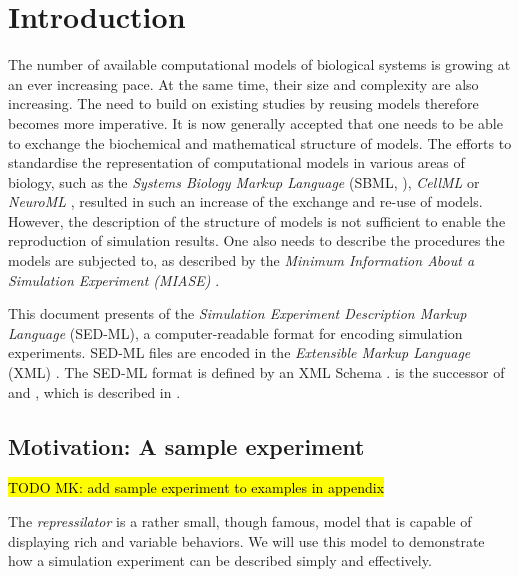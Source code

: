\chapter{Introduction}

The number of available computational models of biological systems is growing at an ever increasing pace. 
At the same time, their size and complexity are also increasing. The need to build on existing studies by reusing models therefore becomes more imperative. It is now generally accepted that one needs to be able to exchange the biochemical and mathematical structure of models. The efforts to standardise the representation of computational models in various areas of biology, such as the \emph{Systems Biology Markup Language} (SBML, \citep{Hucka:2003}), \emph{CellML} \citep{cuellar:2003} or \emph{NeuroML} \citep{Goddard:2001}, resulted in such an increase of the exchange and re-use of models. 
However, the description of the structure of models is not sufficient to enable the reproduction of simulation results.  
One also needs to describe the procedures the models are subjected to, as described by the \emph{Minimum Information About a Simulation Experiment (MIASE)} \citep{Waltemath:2011}. 

This document presents  \currentLV of the \emph{Simulation Experiment Description Markup Language} (SED-ML), a computer-readable format for encoding simulation experiments. SED-ML files are encoded in the \emph{Extensible Markup Language} (XML) \citep{Bray:2006}. The SED-ML format is defined by an XML Schema \citep{Fallside:2001}. \currentLV is the successor of \previousLV and \LoneVone, which is described in \citep{WAB+11}.

\section{Motivation: A sample experiment}
\label{motivation:example}

\hl{TODO MK: add sample experiment to examples in appendix}

The \emph{repressilator} is a rather small, though famous, model that is capable of displaying rich and variable behaviors. We will use this model to demonstrate how a simulation experiment can be described simply and effectively. 

